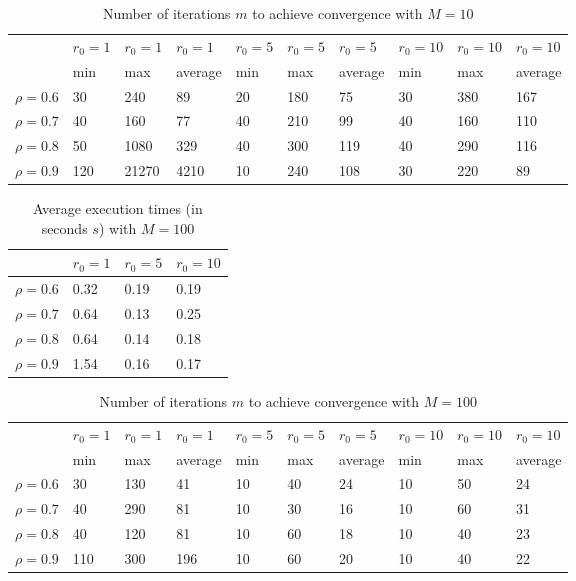 \documentclass[a4paper,11pt,openright]{report}
\begin{document}
\begin{table}[H]
\centering
\addtolength{\leftskip}{-1.5cm}
\addtolength{\rightskip}{-1.5cm}
\begin{tabular}{|c|lllllllll|}
\hline
$ $ & $r_0 = 1$ & $r_0 = 1$ & $r_0 = 1$ & $r_0 = 5$ & $r_0 = 5$ & $r_0 = 5$ & $r_0 = 10$ & $r_0 = 10$ & $r_0 = 10$  \\
$ $ & min & max & average & min & max & average & min & max & average \\ 
\hline
$\rho = 0.6$ & 30 & 240 & 89 & 20 & 180 & 75 & 30 & 380 & 167\\

$\rho = 0.7$ & 40 & 160 & 77 & 40 & 210 & 99 & 40 & 160 & 110\\

$\rho = 0.8$ & 50 & 1080 & 329 & 40 & 300 & 119 & 40 & 290 & 116\\

$\rho = 0.9$ & 120 & 21270 & 4210 & 10 & 240 & 108 & 30 & 220 & 89\\
\hline
\end{tabular}
\caption{Number of iterations $m$ to achieve convergence with $M = 10$}
\end{table}
\begin{table}[H]
\centering
\addtolength{\leftskip}{-1.5cm}
\addtolength{\rightskip}{-1.5cm}
\begin{tabular}{|c|lll|}
\hline
$ $ & $r_0 = 1$ & $r_0 = 5$ & $r_0 = 10$ \\
\hline
$\rho = 0.6$ & 0.32 & 0.19 & 0.19 \\

$\rho = 0.7$ & 0.64 & 0.13 & 0.25 \\

$\rho = 0.8$ & 0.64 & 0.14 & 0.18 \\

$\rho = 0.9$ & 1.54 & 0.16 & 0.17 \\
\hline
\end{tabular}
\caption{Average execution
 times (in seconds $s$) with $M = 100$}
\end{table}
\begin{table}[H]
\centering
\addtolength{\leftskip}{-1.5cm}
\addtolength{\rightskip}{-1.5cm}
\begin{tabular}{|c|lllllllll|}
\hline
$ $ & $r_0 = 1$ & $r_0 = 1$ & $r_0 = 1$ & $r_0 = 5$ & $r_0 = 5$ & $r_0 = 5$ & $r_0 = 10$ & $r_0 = 10$ & $r_0 = 10$  \\
$ $ & min & max & average & min & max & average & min & max & average \\ 
\hline
$\rho = 0.6$ & 30 & 130 & 41 & 10 & 40 & 24 & 10 & 50 & 24\\

$\rho = 0.7$ & 40 & 290 & 81 & 10 & 30 & 16 & 10 & 60 & 31\\

$\rho = 0.8$ & 40 & 120 & 81 & 10 & 60 & 18 & 10 & 40 & 23\\

$\rho = 0.9$ & 110 & 300 & 196 & 10 & 60 & 20 & 10 & 40 & 22\\
\hline
\end{tabular}
\caption{Number of iterations $m$ to achieve convergence with $M = 100$}
\end{table}
\end{document}
